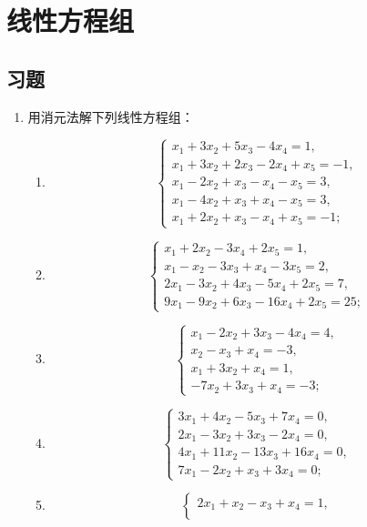 \chapter{线性方程组}

\section{习题}

\begin{enumerate}
  \item 用消元法解下列线性方程组：
  \begin{enumerate}
    \item \[
      \begin{cases}
        x_1+3x_2+5x_3-4x_4=1,\\
        x_1+3x_2+2x_3-2x_4+x_5=-1,\\
        x_1-2x_2+x_3-x_4-x_5=3,\\
        x_1-4x_2+x_3+x_4-x_5=3,\\
        x_1+2x_2+x_3-x_4+x_5=-1;
      \end{cases}
    \]
  \anssub
    \item \[
      \begin{cases}
        x_1+2x_2-3x_4+2x_5=1,\\
        x_1-x_2-3x_3+x_4-3x_5=2,\\
        2x_1-3x_2+4x_3-5x_4+2x_5=7,\\
        9x_1-9x_2+6x_3-16x_4+2x_5=25;
      \end{cases}
    \]
  \anssub
    \item \[
      \begin{cases}
        x_1-2x_2+3x_3-4x_4=4,\\
        x_2-x_3+x_4=-3,\\
        x_1+3x_2+x_4=1,\\
        -7x_2+3x_3+x_4=-3;
      \end{cases}
    \]
  \anssub
    \item \[
      \begin{cases}
        3x_1+4x_2-5x_3+7x_4=0,\\
        2x_1-3x_2+3x_3-2x_4=0,\\
        4x_1+11x_2-13x_3+16x_4=0,\\
        7x_1-2x_2+x_3+3x_4=0;
      \end{cases}
    \]
  \anssub
    \item \[
      \begin{cases}
        2x_1+x_2-x_3+x_4=1,\\

\end{cases}\]
\end{enumerate}
\end{enumerate}
